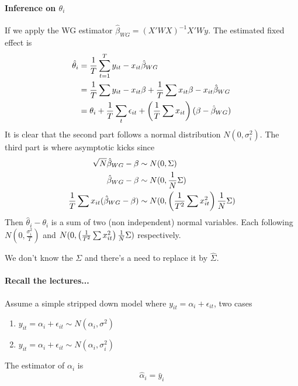 \paragraph{Inference on $\theta_i$}
If we apply the WG estimator $\hat{\beta}_{WG}= (X'WX)^{-1}X'W y$. The
estimated fixed effect is \begin{equation*}
    \begin{split}
        \hat{\theta}_i &= \frac{1}{T}\sum_{t=1}^T y_{it}-x_{it}\hat{\beta}_{WG}\\
        &= \frac{1}{T}\sum y_{it}-x_{it}\beta+\frac{1}{T}\sum x_{it}\beta-x_{it}\hat{\beta}_{WG}\\
        &= \theta_i+\frac{1}{T}\sum_t \epsilon_{it} + \left(\frac{1}{T}\sum x_{it}\right)(\beta-\hat{\beta}_{WG})\\
    \end{split}
\end{equation*}
It is clear that the second part follows a normal distribution $N(0, \sigma_i^2)$. The third part is where asymptotic kicks since
\begin{equation*}
    \begin{split}
        \sqrt{N}\hat{\beta}_{WG} -\beta &\sim N(0, \Sigma)\\
        \hat{\beta}_{WG} -\beta &\sim N(0, \frac{1}{N}\Sigma)\\
        \frac{1}{T}\sum x_{it}(\hat{\beta}_{WG}-\beta)&\sim N(0, \left(\frac{1}{T^2}\sum x_{it}^2\right)\frac{1}{N}\Sigma)\\
    \end{split}
\end{equation*}
Then $\hat{\theta}_i-\theta_i$ is a sum of two (non independent) normal variables. Each following $N(0, \frac{\sigma_i^2}{T})$ and $N(0, \left(\frac{1}{T^2}\sum x_{it}^2\right)\frac{1}{N}\Sigma)$ respectively.
\begin{remark}
    We don't know the $\Sigma$ and there's a need to replace it by $\hat{\Sigma}$.
\end{remark}

\paragraph{Recall the lectures...}
Assume a simple stripped down model where $y_{it}=\alpha_i+\epsilon_{it}$, two
cases \begin{enumerate}
    \item $y_{it}=\alpha_i+\epsilon_{it} \sim N(\alpha_i,\sigma^2)$
    \item $y_{it}=\alpha_i+\epsilon_{it} \sim N(\alpha_i,\sigma_i^2)$
\end{enumerate}
The estimator of $\alpha_i$ is \begin{equation*}
    \hat{\alpha}_i = \bar{y}_i
\end{equation*}

